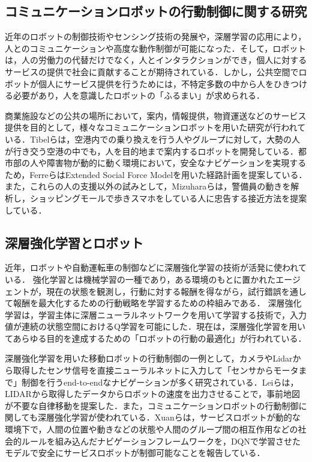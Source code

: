 \documentclass[12pt]{sonota/aislab}
\begin{document}
\subsection{コミュニケーションロボットの行動制御に関する研究}
近年のロボットの制御技術やセンシング技術の発展や，深層学習の応用により，人とのコミュニケーションや高度な動作制御が可能になった．そして，ロボットは，人の労働力の代替だけでなく，人とインタラクションができ，個人に対するサービスの提供で社会に貢献することが期待されている．しかし，公共空間でロボットが個人にサービス提供を行うためには，不特定多数の中から人をひきつける必要があり，人を意識したロボットの「ふるまい」が求められる．

商業施設などの公共の場所において，案内，情報提供，物資運送などのサービス提供を目的として，様々なコミュニケーションロボットを用いた研究が行われている．Tibelらは，空港内での乗り換えを行う人やグループに対して，大勢の人が行き交う空港の中でも，人を目的地まで案内するロボットを開発している\cite{spencr}．都市部の人や障害物が動的に動く環境において，安全なナビゲーションを実現するため，FerreらはExtended Social Force Modelを用いた経路計画を提案している\cite{ESTM}．また，これらの人の支援以外の試みとして，Mizuharaらは，警備員の動きを解析し，ショッピングモールで歩きスマホをしている人に忠告する接近方法を提案している\cite{admonishing}．

\subsection{深層強化学習とロボット}
近年，ロボットや自動運転車の制御などに深層強化学習の技術が活発に使われている．
強化学習とは機械学習の一種であり，ある環境のもとに置かれたエージェントが，現在の状態を観測し，行動に対する報酬を得ながら，試行錯誤を通して報酬を最大化するための行動戦略を学習するための枠組みである\cite{RL}．
深層強化学習は，学習主体に深層ニューラルネットワークを用いて学習する技術で，入力値が連続の状態空間におけるQ学習を可能にした\cite{drl}．現在は，深層強化学習を用いてあらゆる目的を達成するための「ロボットの行動の最適化」が行われている\cite{Human_level_dqn}\cite{sarl}．

深層強化学習を用いた移動ロボットの行動制御の一例として，カメラやLidarから取得したセンサ信号を直接ニューラルネットに入力して「センサからモータまで」制御を行うend-to-endなナビゲーションが多く研究されている\cite{ete}\cite{Self}\cite{vtr}．Leiらは，LIDARから取得したデータからロボットの速度を出力させることで，事前地図が不要な自律移動を提案した\cite{vtr}．また，コミュニケーションロボットの行動制御に関しても深層強化学習が使われている．Xuanらは，サービスロボットが動的な環境下で，人間の位置や動きなどの状態や人間のグループ間の相互作用などの社会的ルールを組み込んだナビゲーションフレームワーク\cite{human_navigation}を，DQNで学習させたモデルで安全にサービスロボットが制御可能なことを報告している\cite{human_navigation_dqn}．
\end{document}
